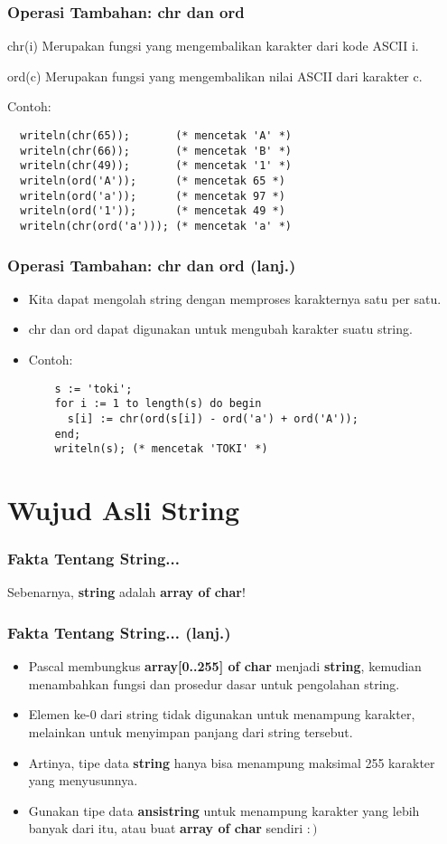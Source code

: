 \begin{frame}[fragile]
\frametitle{Operasi Tambahan: chr dan ord}
\begin{block}{chr(i)}
Merupakan fungsi yang mengembalikan karakter dari kode ASCII i.
\end{block}
\begin{block}{ord(c)}
Merupakan fungsi yang mengembalikan nilai ASCII dari karakter c.
\end{block}
Contoh:
\begin{lstlisting}
  writeln(chr(65));       (* mencetak 'A' *)
  writeln(chr(66));       (* mencetak 'B' *)
  writeln(chr(49));       (* mencetak '1' *)
  writeln(ord('A'));      (* mencetak 65 *)
  writeln(ord('a'));      (* mencetak 97 *)
  writeln(ord('1'));      (* mencetak 49 *)
  writeln(chr(ord('a'))); (* mencetak 'a' *)
\end{lstlisting}
\end{frame}

\begin{frame}[fragile]
\frametitle{Operasi Tambahan: chr dan ord (lanj.)}
\begin{itemize}
  \item Kita dapat mengolah string dengan memproses karakternya satu per satu.
  \item chr dan ord dapat digunakan untuk mengubah karakter suatu string.
  \item Contoh:
  \begin{lstlisting}
    s := 'toki';
    for i := 1 to length(s) do begin
      s[i] := chr(ord(s[i]) - ord('a') + ord('A'));
    end;
    writeln(s);	(* mencetak 'TOKI' *)
  \end{lstlisting}
\end{itemize}
\end{frame}

\section{Wujud Asli String}
\frame{\sectionpage}

\begin{frame}
\frametitle{Fakta Tentang String...}
Sebenarnya, \textbf{string} adalah \textbf{\alert{array of char}}!
\end{frame}

\begin{frame}
\frametitle{Fakta Tentang String... (lanj.)}
\begin{itemize}
  \item Pascal membungkus \textbf{array[0..255] of char} menjadi \textbf{string}, kemudian menambahkan fungsi dan prosedur dasar untuk pengolahan string.
  \item Elemen ke-0 dari string tidak digunakan untuk menampung karakter, melainkan untuk menyimpan \alert{panjang dari string tersebut}.
  \item Artinya, tipe data \textbf{string} hanya bisa menampung maksimal 255 karakter yang menyusunnya.
  \item Gunakan tipe data \textbf{ansistring} untuk menampung karakter yang lebih banyak dari itu, atau buat \textbf{array of char} sendiri $:)$
\end{itemize}
\end{frame}

